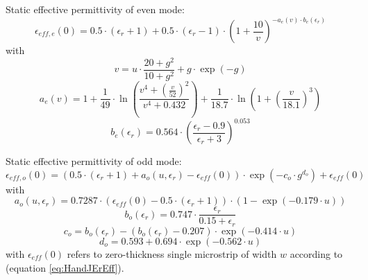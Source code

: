 \documentclass[10pt]{report}
\begin{document}
\addvspace{12pt}

Static effective permittivity of even mode:
\begin{equation}
\epsilon_{eff,e}(0) = 0.5\cdot (\epsilon_r+1) + 0.5\cdot (\epsilon_r-1)\cdot
      \left( 1+\frac{10}{v} \right) ^{-a_e(v)\cdot b_e(\epsilon_r)}
\end{equation}
with
\begin{equation}
v = u\cdot\frac{20+g^2}{10+g^2} + g\cdot\exp(-g)
\end{equation}
\begin{equation}
a_e(v) = 1 + \frac{1}{49}\cdot\ln\left( \frac{v^4 + \left( \frac{v}{52} \right)^2}{v^4 + 0.432} \right)
    + \frac{1}{18.7}\cdot\ln\left( 1 + \left( \frac{v}{18.1} \right)^3 \right)
\end{equation}
\begin{equation}
b_e(\epsilon_r) = 0.564\cdot\left( \frac{\epsilon_r-0.9}{\epsilon_r+3} \right)^{0.053}
\end{equation}

Static effective permittivity of odd mode:
\begin{equation}
\epsilon_{eff,o}(0) = (0.5\cdot (\epsilon_r+1) + a_o(u,\epsilon_r) - \epsilon_{eff}(0) ) \cdot
      \exp(-c_o\cdot g^{d_o}) + \epsilon_{eff}(0)
\end{equation}
with
\begin{equation}
a_o(u,\epsilon_r) = 0.7287\cdot( \epsilon_{eff}(0) - 0.5\cdot ( \epsilon_r + 1) ) \cdot
      (1-\exp(-0.179\cdot u))
\end{equation}
\begin{equation}
b_o(\epsilon_r) = 0.747\cdot\frac{\epsilon_r}{0.15+\epsilon_r}
\end{equation}
\begin{equation}
c_o = b_o(\epsilon_r) - (b_o(\epsilon_r)-0.207)\cdot\exp(-0.414\cdot u)
\end{equation}
\begin{equation}
d_o = 0.593+0.694\cdot\exp(-0.562\cdot u)
\end{equation}
with $\epsilon_{eff}(0)$ refers to zero-thickness single microstrip of width
$w$ according to \cite{Hammerstad} (equation \ref{eq:HandJErEff}).

\addvspace{12pt}
\end{document}
